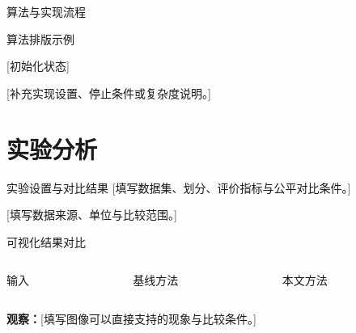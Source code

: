 \documentclass[aspectratio=169,11pt]{beamer}
\begin{document}
\begin{frame}[fragile]{算法与实现流程}
  \begin{algorithm}[H]
    \caption{算法排版示例}
    \KwOut{[输出结果]}
    [初始化状态]\;
    \For{[满足迭代条件]}{
      [读取或采样输入]\;
      [执行核心计算]\;
      [更新状态]\;
    }
    \Return{[输出结果]}\;
  \end{algorithm}
  \vspace{.2cm}
  {\small\color{muted}[补充实现设置、停止条件或复杂度说明。]}
\end{frame}

\section{实验分析}
\begin{frame}{实验设置与对比结果}
  [填写数据集、划分、评价指标与公平对比条件。]
  \vspace{.35cm}
  \begin{center}
  \end{center}
  \vspace{.25cm}
  {\small\color{muted}[填写数据来源、单位与比较范围。]}
\end{frame}

\begin{frame}{可视化结果对比}
  \begin{columns}[T,onlytextwidth]
    \begin{column}{.31\textwidth}
      \ImagePlaceholder[2.9cm]{[输入图像]}
      \centering\small 输入
    \end{column}
    \begin{column}{.31\textwidth}
      \ImagePlaceholder[2.9cm]{[基线结果]}
      \centering\small 基线方法
    \end{column}
    \begin{column}{.31\textwidth}
      \ImagePlaceholder[2.9cm]{[本文结果]}
      \centering\small 本文方法
    \end{column}
  \end{columns}
  \vspace{.45cm}
  \textbf{观察：}[填写图像可以直接支持的现象与比较条件。]
\end{frame}
\end{document}
